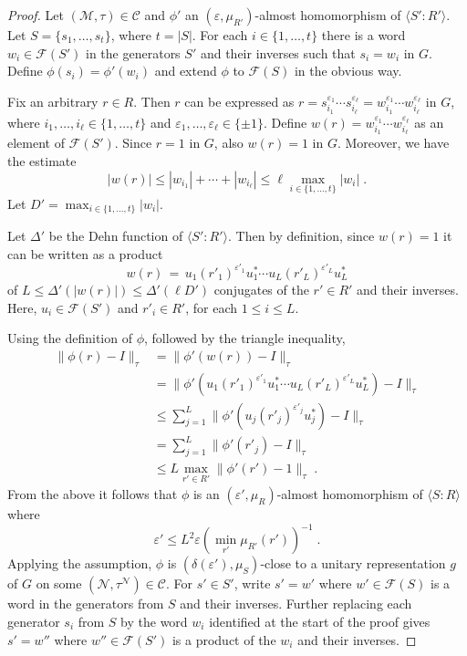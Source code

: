 \documentclass[11pt]{article}
\theoremstyle{definition}
\newcommand{\mC}{\ensuremath{\mathcal{C}}}
\newcommand{\cM}{\ensuremath{\mathcal{M}}}
\newcommand{\eps}{\varepsilon}
\newcommand{\mN}{\mathcal{N}}
\begin{document}
\begin{proof}
Let $(\cM,\tau)\in \mC$ and $\phi'$ an $(\eps,\mu_{R'})$-almost homomorphism of $\langle S':R'\rangle$. Let $S=\{s_1,\ldots,s_t\}$, where $t=|S|$. For each $i\in\{1,\ldots,t\}$ there is a word $w_i\in \mathcal{F}(S')$ in the generators $S'$ and their inverses such that $s_i=w_i$ in $G$. Define $\phi(s_i)=\phi'(w_i)$ and extend $\phi$ to $\mathcal{F}(S)$ in the obvious way.

Fix an arbitrary $r\in R$. Then $r$ can be expressed as $r=s_{i_1}^{\eps_1}\cdots s_{i_\ell}^{\eps_\ell}=w_{i_1}^{\eps_1}\cdots w_{i_\ell}^{\eps_\ell}$ in $G$, where $i_1,\ldots,i_\ell\in \{1,\ldots,t\}$ and $\eps_1,\ldots,\eps_\ell\in\{\pm 1\}$. Define $w(r) = w_{i_1}^{\eps_1}\cdots w_{i_\ell}^{\eps_\ell}$ as an element of $\mathcal{F}(S')$. Since $r=1$ in $G$, also $w(r)=1$ in $G$. Moreover, we have the estimate 
\[ |w(r)| \leq |w_{i_1}|+\cdots+|w_{i_\ell}|\leq \ell \max_{i\in \{1,\ldots,t\}}|w_i|\;.\]
Let $D'=\max_{i\in \{1,\ldots,t\}}|w_i|$. 

Let $\Delta'$ be the Dehn function of $\langle S':R'\rangle$. Then by definition, since $w(r)=1$ it can be written as a product 
\[ w(r)\,=\, u_1 (r'_{1})^{\eps'_1} u_1^* \cdots u_L (r'_{L})^{\eps'_L}u_L^* \]
of $L\leq \Delta'(|w(r)|) \leq \Delta'(\ell D')$ conjugates of the $r'\in R'$ and their inverses. Here, $u_i\in \mathcal{F}(S')$ and $r'_i\in R'$, for each $1\leq i \leq L$. 

Using the definition of $\phi$, followed by the triangle inequality, 
\begin{align*}
\|\phi(r)-I\|_\tau &= \|\phi'(w(r))-I\|_\tau\\
&= \|\phi'( u_1 (r'_{1})^{\eps'_1}u_1^* \cdots u_L (r'_{L})^{\eps'_L} u_L^* ) - I \|_\tau\\
&\leq  \sum_{j=1}^L \|\phi'( u_j (r'_{j})^{\eps'_j}u_j^* ) - I \|_\tau\\
&=  \sum_{j=1}^L \|\phi'( r'_{j}) - I \|_\tau\\
&\leq L \max_{r'\in R'} \|\phi'(r')-1\|_\tau\;.
\end{align*}
 From the above it follows that $\phi$ is an $(\eps',\mu_R)$-almost homomorphism of $\langle S:R\rangle$ where 
\begin{equation}\label{eq:sg-1a}
\eps' \leq  L^2 \eps (\min_{r'}\mu_{R'}(r'))^{-1} \;.
\end{equation}
Applying the assumption, $\phi$ is $(\delta(\eps'),\mu_S)$-close to a unitary representation $g$ of $G$ on some $(\mathcal{N}, \tau^\mN)\in \mC$. 
For $s'\in S'$, write $s' = w'$ where $w'\in\mathcal{F}(S)$ is a word in the generators from $S$ and their inverses. Further replacing each generator $s_i$ from $S$ by the word $w_i$ identified at the start of the proof gives $s'=w''$ where $w''\in \mathcal{F}(S')$ is a product of the $w_i$ and their inverses. 


\end{proof}
\end{document}
